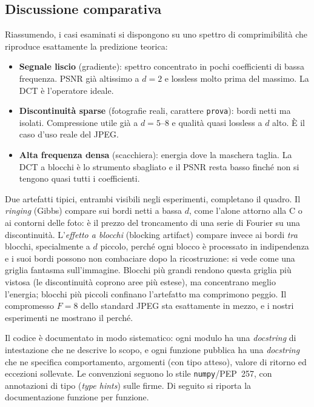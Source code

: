 \documentclass[11pt,a4paper]{article}
\makeatletter
\let\@origtexttt\texttt
\renewcommand{\texttt}[1]{{\def\_{\textunderscore\discretionary{}{}{}}\@origtexttt{#1}}}
\makeatother
\begin{document}
\subsection{Discussione comparativa}

Riassumendo, i casi esaminati si dispongono su uno spettro di
comprimibilità che riproduce esattamente la predizione teorica:

\begin{itemize}
  \item \textbf{Segnale liscio} (gradiente): spettro concentrato in pochi
        coefficienti di bassa frequenza. PSNR già altissimo a $d=2$ e
        lossless molto prima del massimo. La DCT è l'operatore ideale.
  \item \textbf{Discontinuità sparse} (fotografie reali, carattere
        \texttt{prova}): bordi netti ma isolati. Compressione utile già a
        $d=5$--$8$ e qualità quasi lossless a $d$ alto. È il caso d'uso
        reale del JPEG.
  \item \textbf{Alta frequenza densa} (scacchiera): energia dove la maschera
        taglia. La DCT a blocchi è lo strumento sbagliato e il PSNR resta
        basso finché non si tengono quasi tutti i coefficienti.
\end{itemize}

Due artefatti tipici, entrambi visibili negli esperimenti, completano il
quadro. Il \emph{ringing} (Gibbs) compare sui bordi netti a bassa $d$, come
l'alone attorno alla C o ai contorni delle foto: è il prezzo del troncamento
di una serie di Fourier su una discontinuità. L'\emph{effetto a blocchi}
(blocking artifact) compare invece ai bordi \emph{tra} blocchi,
specialmente a $d$ piccolo, perché ogni blocco è processato in
indipendenza e i suoi bordi possono non combaciare dopo la ricostruzione: si
vede come una griglia fantasma sull'immagine. Blocchi più grandi rendono
questa griglia più vistosa (le discontinuità coprono aree più estese), ma
concentrano meglio l'energia; blocchi più piccoli confinano l'artefatto ma
comprimono peggio. Il compromesso $F=8$ dello standard JPEG sta esattamente
in mezzo, e i nostri esperimenti ne mostrano il perché.


Il codice è documentato in modo sistematico: ogni modulo ha una \emph{docstring}
di intestazione che ne descrive lo scopo, e ogni funzione pubblica ha una
\emph{docstring} che ne specifica comportamento, argomenti (con tipo atteso),
valore di ritorno ed eccezioni sollevate. Le convenzioni seguono lo stile
\texttt{numpy}/PEP~257, con annotazioni di tipo (\emph{type hints}) sulle
firme. Di seguito si riporta la documentazione funzione per funzione.
\end{document}
